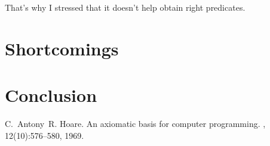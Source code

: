 \documentclass[twoside,twocolumn]{article}
\begin{document}
That's why I stressed that it doesn't help obtain right predicates. 













\section{Shortcomings}

\section{Conclusion}

\begin{thebibliography}{99} %

C.~Antony~R. Hoare.
\newblock An axiomatic basis for computer programming.
, 12(10):576--580, 1969.

\end{thebibliography}

\end{document}
